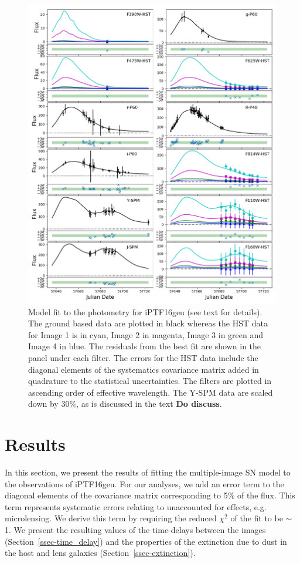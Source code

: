 \documentclass[a4paper,fleqn,usenatbib]{mnras}
\begin{document}
\begin{figure}
    \centering
    \includegraphics[width=.9\textwidth]{16geu_lcfit.png}
    \caption{Model fit to the photometry for iPTF16geu (see text for details). The ground based data are plotted in black whereas the HST data for Image 1 is in cyan, Image 2 in magenta, Image 3 in green and Image 4 in blue. The residuals from the best fit are shown in the panel under each filter. The errors for the HST data include the diagonal elements of the systematics covariance matrix added in quadrature to the statistical uncertainties. The filters are plotted in ascending order of effective wavelength. The Y-SPM data are scaled down by 30$\%$, as is discussed in the text {\bf Do discuss}.  }
    \label{fig:16geu_lc}
\end{figure}

\section{Results}
\label{sec:results}
In this section, we present the results of fitting the multiple-image SN model to the observations of iPTF16geu. For our analyses, we add an error term to the diagonal elements of the covariance matrix corresponding to 5$\%$ of the flux. This term represents systematic errors relating to unaccounted for effects, e.g. microlensing. We derive this term by requiring the reduced $\chi^2$ of the fit to be $\sim$ 1. 
 We present the resulting values of the time-delays between the images (Section~\ref{ssec-time_delay}) and the properties of the extinction due to dust in the host and lens galaxies (Section~\ref{ssec-extinction}). 
\end{document}
